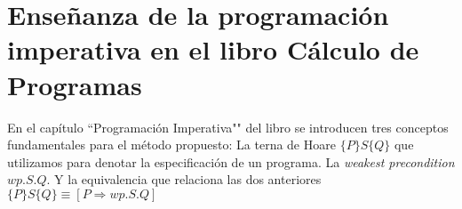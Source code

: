 \documentclass[11pt, a4paper, openany]{book}
\begin{document}
    \chapter{Enseñanza de la programación imperativa en el libro Cálculo de Programas}

    En el capítulo ``Programación Imperativa"" del libro se introducen tres conceptos fundamentales para el método propuesto: La terna de Hoare
        \begin{math}
            \{P\}S\{Q\}
        \end{math} que utilizamos para denotar la especificación de un programa. La \textit{weakest precondition}
        \begin{math}
            wp.S.Q
        \end{math}. Y la equivalencia que relaciona las dos anteriores \begin{math}
            \{P\}S\{Q\} \equiv [P \Rightarrow wp.S.Q]
        \end{math}
\end{document}
